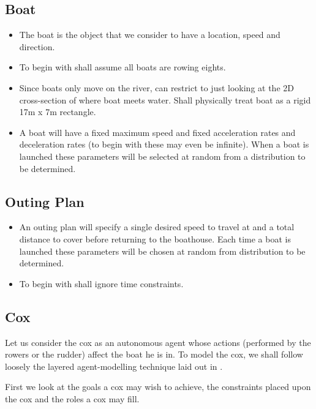 \subsection{Boat}
\begin{itemize}
  \item The boat is the object that we consider to have a location, speed and direction.
  \item To begin with shall assume all boats are rowing eights.
  \item Since boats only move on the river, can restrict to just looking at the 2D cross-section of where boat
    meets water. Shall physically treat boat as a rigid 17m x 7m rectangle.
  \item A boat will have a fixed maximum speed and fixed acceleration
    rates and deceleration rates (to begin with these may even be
    infinite). When a boat is launched these parameters will be
    selected at random from a distribution to be determined.
\end{itemize}

\subsection{Outing Plan}
\begin{itemize}
  \item An outing plan will specify a single desired speed to travel at
    and a total distance to cover before returning to the
    boathouse. Each time a boat is launched these parameters will be
    chosen at random from distribution to be determined.
  \item To begin with shall ignore time constraints.
\end{itemize}

\subsection{Cox}
Let us consider the cox as an autonomous agent whose actions
(performed by the rowers or the rudder) affect the boat he is in. To
model the cox, we shall follow loosely the layered agent-modelling
technique laid out in \cite{Sterling2009}. 

First we look at the
goals a cox may wish to achieve, the constraints placed upon the cox
and the roles a cox may fill.

